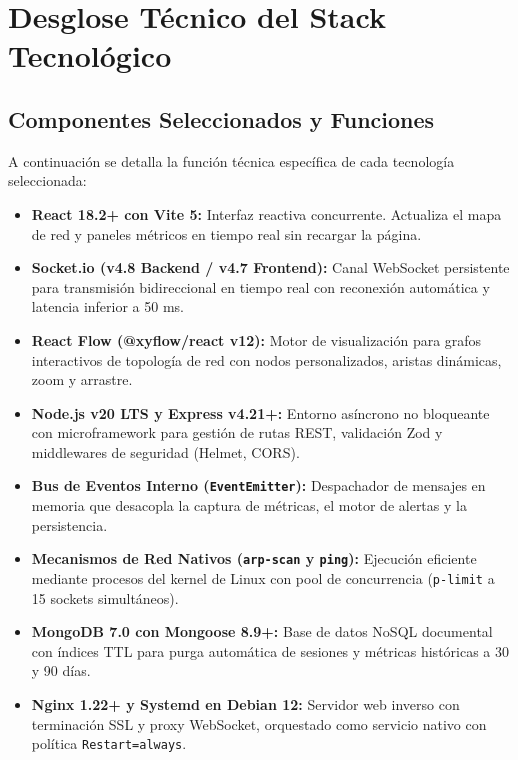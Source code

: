 \documentclass[12pt,a4paper]{report}
\begin{document}
\newpage
\chapter{Desglose Técnico del Stack Tecnológico}

\section{Componentes Seleccionados y Funciones}
A continuación se detalla la función técnica específica de cada tecnología seleccionada:

\begin{itemize}
  \item \textbf{React 18.2+ con Vite 5:} Interfaz reactiva concurrente. Actualiza el mapa de red y paneles métricos en tiempo real sin recargar la página.
  \item \textbf{Socket.io (v4.8 Backend / v4.7 Frontend):} Canal WebSocket persistente para transmisión bidireccional en tiempo real con reconexión automática y latencia inferior a 50 ms.
  \item \textbf{React Flow (@xyflow/react v12):} Motor de visualización para grafos interactivos de topología de red con nodos personalizados, aristas dinámicas, zoom y arrastre.
  \item \textbf{Node.js v20 LTS y Express v4.21+:} Entorno asíncrono no bloqueante con microframework para gestión de rutas REST, validación Zod y middlewares de seguridad (Helmet, CORS).
  \item \textbf{Bus de Eventos Interno (\texttt{EventEmitter}):} Despachador de mensajes en memoria que desacopla la captura de métricas, el motor de alertas y la persistencia.
  \item \textbf{Mecanismos de Red Nativos (\texttt{arp-scan} y \texttt{ping}):} Ejecución eficiente mediante procesos del kernel de Linux con pool de concurrencia (\texttt{p-limit} a 15 sockets simultáneos).
  \item \textbf{MongoDB 7.0 con Mongoose 8.9+:} Base de datos NoSQL documental con índices TTL para purga automática de sesiones y métricas históricas a 30 y 90 días.
  \item \textbf{Nginx 1.22+ y Systemd en Debian 12:} Servidor web inverso con terminación SSL y proxy WebSocket, orquestado como servicio nativo con política \texttt{Restart=always}.
\end{itemize}
\end{document}
